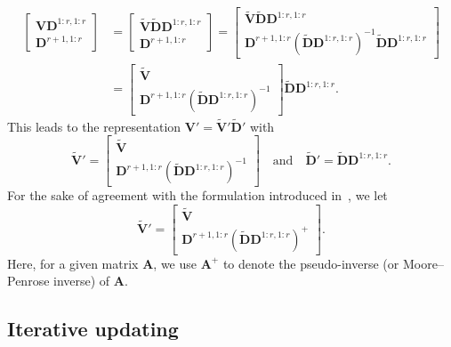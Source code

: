 \documentclass[11pt,a4paper]{article}
\theoremstyle{break}
\numberwithin{dummy}{section}
\theoremstyle{plain}
\theoremstyle{plain}
\theoremstyle{plain}
\theoremstyle{plain}
\theoremstyle{plain}
\theoremstyle{MyNonumberplain}
\newcommand{\0}{\M{0}}
\newcommand{\M}[1]{\mathbf{#1}}
\newcommand{\Mt}[1]{\tilde{\M{#1}}}
\begin{document}
\begin{enumerate}[font=\upshape,label=(\roman*),wide,align=right]
\begin{align*}
\begin{bmatrix}
          \M{V} \M{D}^{1:r,1:r}
          \\
          \M{D}^{r+1,1:r}
        \end{bmatrix}
      & =
        \begin{bmatrix}
          \Mt{V} \Mt{D} \M{D}^{1:r,1:r}
          \\
          \M{D}^{r+1,1:r}
        \end{bmatrix}
    =
    \begin{bmatrix}
      \Mt{V} \Mt{D} \M{D}^{1:r, 1:r}
      \\
      \M{D}^{r+1, 1:r} \left(\Mt{D} \M{D}^{1:r,1:r} \right)^{-1} \Mt{D} \M{D}^{1:r, 1:r}
    \end{bmatrix}
    \\
      & =
        \begin{bmatrix}
          \Mt{V}
          \\
          \M{D}^{r+1, 1:r} \left(\Mt{D} \M{D}^{1:r,1:r} \right)^{-1}
        \end{bmatrix}
    \Mt{D} \M{D}^{1:r, 1:r}.
  \end{align*}
  This leads to the representation
  \begin{math}
    \M{V}' = \Mt{V}' \Mt{D}'
  \end{math}
  with
  \begin{displaymath}
    \Mt{V}' =
    \begin{bmatrix}
      \Mt{V}
      \\
      \M{D}^{r+1, 1:r} \left(\Mt{D} \M{D}^{1:r,1:r} \right)^{-1}
    \end{bmatrix}
    \quad
    \text{and}
    \quad
    \Mt{D}' =
    \Mt{D} \M{D}^{1:r, 1:r}.
  \end{displaymath}
  For the sake of agreement with the formulation introduced in~\cite{brand06:_fast}, we let
   \begin{displaymath}
    \Mt{V}' =
    \begin{bmatrix}
      \Mt{V}
      \\
      \M{D}^{r+1, 1:r} \left(\Mt{D} \M{D}^{1:r,1:r} \right)^+
    \end{bmatrix}.
  \end{displaymath}
  Here, for a given matrix $\M{A}$, we use $\M{A}^+$ to denote the pseudo-inverse (or Moore--Penrose inverse) of $\M{A}$.
\end{enumerate}

\subsection{Iterative updating}
\end{document}

